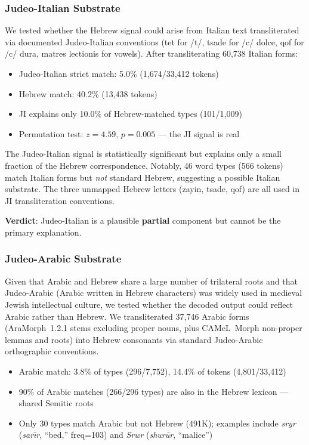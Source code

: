 \documentclass[11pt,a4paper]{article}
\begin{document}
\subsubsection{Judeo-Italian Substrate}
\label{sec:ji}

We tested whether the Hebrew signal could arise from Italian text
transliterated via documented Judeo-Italian conventions (tet for /t/, tsade
for /c/ dolce, qof for /c/ dura, matres lectionis for vowels). After
transliterating 60,738 Italian forms:

\begin{itemize}
\item Judeo-Italian strict match: 5.0\% (1,674/33,412 tokens)
\item Hebrew match: 40.2\% (13,438 tokens)
\item JI explains only 10.0\% of Hebrew-matched types (101/1,009)
\item Permutation test: $z=4.59$, $p=0.005$ --- the JI signal is real
\end{itemize}

The Judeo-Italian signal is statistically significant but explains only a
small fraction of the Hebrew correspondence. Notably, 46 word types (566
tokens) match Italian forms but \emph{not} standard Hebrew, suggesting a
possible Italian substrate. The three unmapped Hebrew letters (zayin, tsade,
qof) are all used in JI transliteration conventions.

\textbf{Verdict}: Judeo-Italian is a plausible \textbf{partial} component
but cannot be the primary explanation.

\subsubsection{Judeo-Arabic Substrate}
\label{sec:ja}

Given that Arabic and Hebrew share a large number of trilateral roots and
that Judeo-Arabic (Arabic written in Hebrew characters) was widely used in
medieval Jewish intellectual culture, we tested whether the decoded output
could reflect Arabic rather than Hebrew. We transliterated 37,746 Arabic
forms (AraMorph~1.2.1 stems excluding proper nouns, plus CAMeL~Morph
non-proper lemmas and roots) into Hebrew consonants via standard
Judeo-Arabic orthographic conventions.

\begin{itemize}
\item Arabic match: 3.8\% of types (296/7,752), 14.4\% of tokens (4,801/33,412)
\item 90\% of Arabic matches (266/296 types) are also in the Hebrew lexicon --- shared Semitic roots
\item Only 30 types match Arabic but not Hebrew (491K); examples include
  \emph{sryr} (\textit{sar\={\i}r}, ``bed,'' freq=103) and \emph{Srwr} (\textit{shur\=ur}, ``malice'')
\end{itemize}
\end{document}
